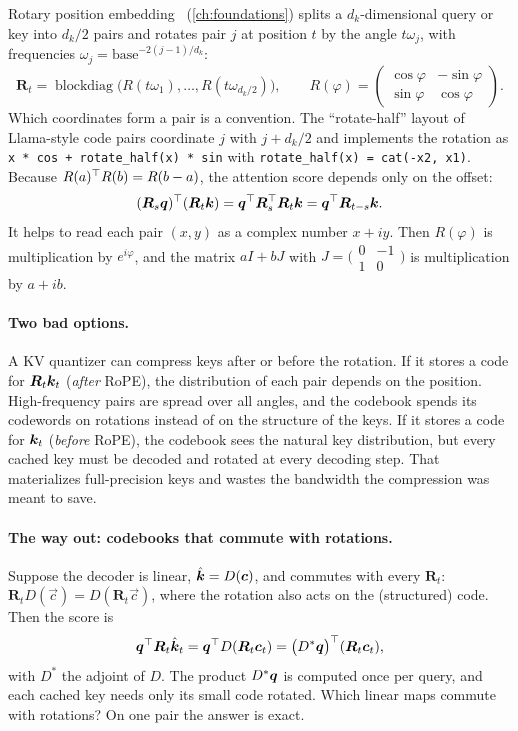 Rotary position embedding~\citep{c01-su2024roformer} (\cref{ch:foundations}) splits a $d_k$-dimensional
query or key into $d_k/2$ pairs and rotates pair $j$ at position $t$ by the angle $t\omega_j$, with
frequencies $\omega_j=\text{base}^{-2(j-1)/d_k}$:
\[
  \bm{R}_t=\operatorname{blockdiag}\bigl(R(t\omega_1),\dots,R(t\omega_{d_k/2})\bigr),\qquad
  R(\varphi)=\begin{pmatrix}\cos\varphi&-\sin\varphi\\ \sin\varphi&\cos\varphi\end{pmatrix}.
\]
Which coordinates form a pair is a convention. The ``rotate-half'' layout of Llama-style code pairs
coordinate $j$ with $j+d_k/2$ and implements the rotation as \texttt{x * cos + rotate\_half(x) * sin} with
\texttt{rotate\_half(x) = cat(-x2, x1)}. Because $R(a)^{\top} R(b)=R(b-a)$, the attention score depends only on
the offset:
\begin{equation}\label{eq:c13-rope-rel}
  (\bm{R}_s\bm{q})^{\top}(\bm{R}_t\bm{k}) = \bm{q}^{\top}\bm{R}_s^{\top}\bm{R}_t\bm{k} = \bm{q}^{\top}\bm{R}_{t-s}\bm{k} .
\end{equation}
It helps to read each pair $(x,y)$ as a complex number $x+iy$. Then $R(\varphi)$ is multiplication by
$e^{i\varphi}$, and the matrix $aI+bJ$ with $J=\bigl(\begin{smallmatrix}0&-1\\1&0\end{smallmatrix}\bigr)$
is multiplication by $a+ib$.

\paragraph{Two bad options.} A KV quantizer can compress keys after or before the rotation. If it
stores a code for $\bm{R}_t\bm{k}_t$ (\emph{after} RoPE), the distribution of each pair depends on the position.
High-frequency pairs are spread over all angles, and the codebook spends its codewords on rotations
instead of on the structure of the keys. If it stores a code for $\bm{k}_t$ (\emph{before} RoPE), the codebook
sees the natural key distribution, but every cached key must be decoded and rotated at every decoding
step. That materializes full-precision keys and wastes the bandwidth the compression was meant to save.

\paragraph{The way out: codebooks that commute with rotations.} Suppose the decoder is linear,
$\hat{\bm{k}}=D(\bm{c})$, and commutes with every $\bm{R}_t$: $\bm{R}_tD(\vec{c})=D(\bm{R}_t\vec{c})$, where the
rotation also acts on the (structured) code. Then the score is
\[
  \bm{q}^{\top}\bm{R}_t\hat{\bm{k}}_t = \bm{q}^{\top} D(\bm{R}_t\bm{c}_t) = \bigl(D^{*}\bm{q}\bigr)^{\top}(\bm{R}_t\bm{c}_t),
\]
with $D^{*}$ the adjoint of $D$. The product $D^{*}\bm{q}$ is computed once per query, and each cached key
needs only its small code rotated. Which linear maps commute with rotations? On one pair the answer is
exact.

